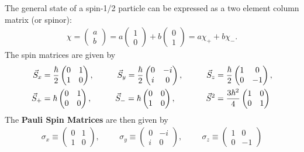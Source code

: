 The general state of a spin-1/2 particle can be expressed as a two element column matrix (or spinor):
\begin{align}
\chi= \begin{pmatrix}
a\\b
\end{pmatrix} = a \begin{pmatrix}
1\\0
\end{pmatrix}+b\begin{pmatrix}
0\\1
\end{pmatrix}= a \chi_++b\chi_-.
\end{align}
The spin matrices are given by
\begin{align}
\vec{S}_x &= \frac{\hbar}{2}\begin{pmatrix}
0 & 1 \\ 1 & 0
\end{pmatrix}, \hspace{1cm}\vec{S}_y = \frac{\hbar}{2}\begin{pmatrix}
0 & -i \\ i & 0
\end{pmatrix}, \hspace{1cm}\vec{S}_z = \frac{\hbar}{2}\begin{pmatrix}
1 & 0 \\ 0 & -1
\end{pmatrix}, \\ \vec{S}_+ &= \hbar\begin{pmatrix}
0 & 1 \\ 0 & 0
\end{pmatrix}, \hspace{1cm}\vec{S}_- = \hbar\begin{pmatrix}
0 & 0 \\ 1 & 0
\end{pmatrix}, \hspace{1.3cm}\vec{S}^2 = \frac{3\hbar^2}{4}\begin{pmatrix}
1 & 0 \\ 0 & 1
\end{pmatrix}
\end{align}
The \textbf{Pauli Spin Matrices} are then given by
\begin{align}
\sigma_x \equiv \begin{pmatrix}
0 & 1 \\ 1 & 0
\end{pmatrix}, \hspace{1cm}\sigma_y \equiv \begin{pmatrix}
0 & -i \\ i & 0
\end{pmatrix}, \hspace{1cm}\sigma_z \equiv \begin{pmatrix}
1 & 0 \\ 0 & -1
\end{pmatrix}
\end{align}

